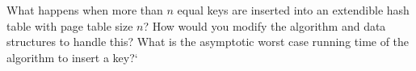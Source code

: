 What happens when more than $n$ equal keys are inserted into an 
extendible hash table with page table size $n$? How would  you
modify the algorithm and data structures to handle this? What is 
the asymptotic worst case running time of the algorithm to insert
a key?`
